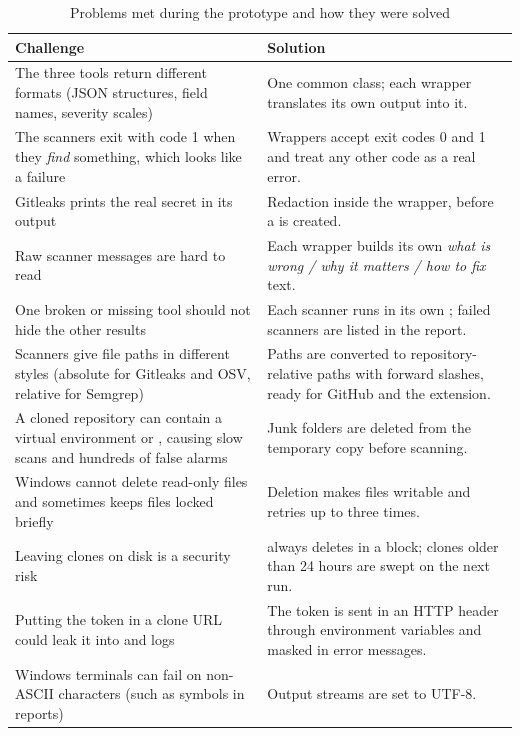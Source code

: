 \documentclass[12pt,a4paper]{article}
\newcommand{\code}[1]{\texttt{\detokenize{#1}}}
\begin{document}
\begin{table}[H]
\centering
\caption{Problems met during the prototype and how they were solved}
\label{tab:challenges}
\begin{tabularx}{\textwidth}{@{}p{5.3cm}X@{}}
\toprule
\textbf{Challenge} & \textbf{Solution} \\
\midrule
The three tools return different formats (JSON structures, field names, severity scales) & One common \code{Finding} class; each wrapper translates its own output into it. \\
The scanners exit with code 1 when they \emph{find} something, which looks like a failure & Wrappers accept exit codes 0 and 1 and treat any other code as a real error. \\
Gitleaks prints the real secret in its output & Redaction inside the wrapper, before a \code{Finding} is created. \\
Raw scanner messages are hard to read & Each wrapper builds its own \emph{what is wrong / why it matters / how to fix} text. \\
One broken or missing tool should not hide the other results & Each scanner runs in its own \code{try/except}; failed scanners are listed in the report. \\
Scanners give file paths in different styles (absolute for Gitleaks and OSV, relative for Semgrep) & Paths are converted to repository-relative paths with forward slashes, ready for GitHub and the extension. \\
A cloned repository can contain a virtual environment or \code{node\_modules}, causing slow scans and hundreds of false alarms & Junk folders are deleted from the temporary copy before scanning. \\
Windows cannot delete read-only \code{.git} files and sometimes keeps files locked briefly & Deletion makes files writable and retries up to three times. \\
Leaving clones on disk is a security risk & \code{temporary_clone} always deletes in a \code{finally} block; clones older than 24 hours are swept on the next run. \\
Putting the token in a clone URL could leak it into \code{.git/config} and logs & The token is sent in an HTTP header through environment variables and masked in error messages. \\
Windows terminals can fail on non-ASCII characters (such as symbols in reports) & Output streams are set to UTF-8. \\
\bottomrule
\end{tabularx}
\end{table}
\end{document}
